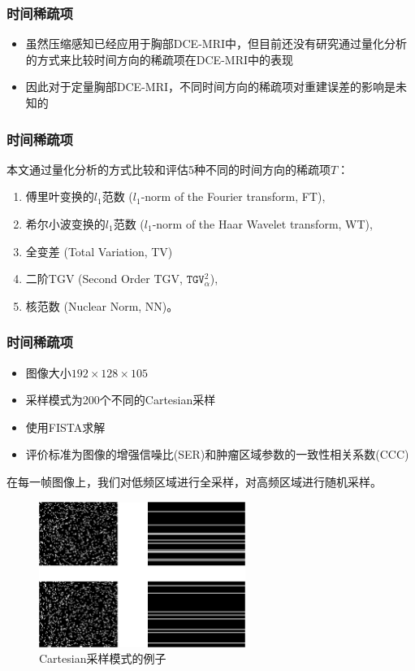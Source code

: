 \documentclass{beamer}
\begin{document}
\begin{frame}
	\frametitle{时间稀疏项}
	\begin{itemize}
		\item 虽然压缩感知已经应用于胸部DCE-MRI中，但目前还没有研究通过量化分析的方式来比较时间方向的稀疏项在DCE-MRI中的表现
		\item 因此对于定量胸部DCE-MRI，不同时间方向的稀疏项对重建误差的影响是未知的
	\end{itemize}
\end{frame}

\begin{frame}
	\frametitle{时间稀疏项}
	本文通过量化分析的方式比较和评估5种不同的时间方向的稀疏项$T$：
\begin{enumerate}
	\item 傅里叶变换的$l_1$范数 ($l_1$-norm of the Fourier transform, FT),
	\item 希尔小波变换的$l_1$范数 ($l_1$-norm of the Haar Wavelet transform, WT),
	\item 全变差 (Total Variation, TV)
	\item 二阶TGV (Second Order TGV, $\texttt{TGV}_{\alpha}^2$),
	\item 核范数 (Nuclear Norm, NN)。
\end{enumerate}
\end{frame}

\begin{frame}
	\frametitle{时间稀疏项}
	\begin{itemize}
		\item 图像大小$192\times 128\times 105$
		\item 采样模式为200个不同的Cartesian采样
		\item 使用FISTA求解
		\item 评价标准为图像的增强信噪比(SER)和肿瘤区域参数的一致性相关系数(CCC)
	\end{itemize}
\end{frame}

\begin{frame}
在每一帧图像上，我们对低频区域进行全采样，对高频区域进行随机采样。
\begin{figure}
\centering
  \includegraphics[width=0.6\textwidth]{../img/qetsr/figure1.eps}
\caption{
Cartesian采样模式的例子
}
\end{figure}
\end{frame}
\end{document}
